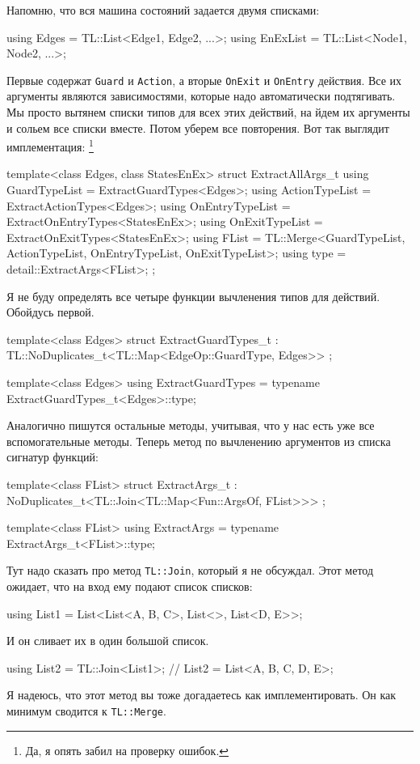 \documentclass{article}
\begin{document}
{Напомню, что вся машина состояний задается двумя списками:
\begin{cppcode}[\nonumbers]
using Edges = TL::List<Edge1, Edge2, ...>;
using EnExList = TL::List<Node1, Node2, ...>;
\end{cppcode}
Первые содержат \verb"Guard" и \verb"Action", а вторые \verb"OnExit" и \verb"OnEntry" действия.
Все их аргументы являются зависимостями, которые надо автоматически подтягивать.
Мы просто вытянем списки типов для всех этих действий, на	йдем их аргументы и сольем все списки вместе.
Потом уберем все повторения.
Вот так выглядит имплементация:%
\footnote{Да, я опять забил на проверку ошибок.}
\begin{cppcode}[\nonumbers]
template<class Edges, class StatesEnEx>
struct ExtractAllArgs_t {
  using GuardTypeList = ExtractGuardTypes<Edges>;
  using ActionTypeList = ExtractActionTypes<Edges>;
  using OnEntryTypeList = ExtractOnEntryTypes<StatesEnEx>;
  using OnExitTypeList = ExtractOnExitTypes<StatesEnEx>;
  using FList = TL::Merge<GuardTypeList, ActionTypeList, OnEntryTypeList, OnExitTypeList>;
  using type = detail::ExtractArgs<FList>;
};
\end{cppcode}
Я не буду определять все четыре функции вычленения типов для действий.
Обойдусь первой.
\begin{cppcode}[\nonumbers]
template<class Edges>
struct ExtractGuardTypes_t
    : TL::NoDuplicates_t<TL::Map<EdgeOp::GuardType, Edges>> {};

template<class Edges>
using ExtractGuardTypes = typename ExtractGuardTypes_t<Edges>::type;
\end{cppcode}
Аналогично пишутся остальные методы, учитывая, что у нас есть уже все вспомогательные методы.
Теперь метод по вычленению аргументов из списка сигнатур функций:
\begin{cppcode}[\nonumbers]
template<class FList>
struct ExtractArgs_t : NoDuplicates_t<TL::Join<TL::Map<Fun::ArgsOf, FList>>> {
};

template<class FList>
using ExtractArgs = typename ExtractArgs_t<FList>::type;
\end{cppcode}
Тут надо сказать про метод \verb"TL::Join", который я не обсуждал.
Этот метод ожидает, что на вход ему подают список списков:
\begin{cppcode}[\nonumbers]
using List1 = List<List<A, B, C>, List<>, List<D, E>>;
\end{cppcode}
И он сливает их в один большой список.
\begin{cppcode}[\nonumbers]
using List2 = TL::Join<List1>;
// List2 = List<A, B, C, D, E>;
\end{cppcode}
Я надеюсь, что этот метод вы тоже догадаетесь как имплементировать.
Он как минимум сводится к \verb"TL::Merge".

}
\end{document}
